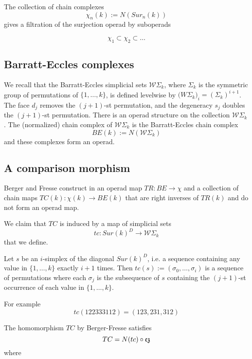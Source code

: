 
The collection of chain complexes 
$$\chi_n(k):=N(Sur_n(k))$$ 
gives a filtration of the surjection operad by suboperads

$$\chi_1 \subset \chi_2 \subset  \dots $$



\subsection{Barratt-Eccles complexes}

We recall that the Barratt-Eccles simplicial sets $\mathcal{W}\Sigma_k$, where  $\Sigma_k$ is the symmetric group of permutations of $\{1,\dots,k\}$, is defined levelwise by
$\mathcal({W}\Sigma_k)_i=(\Sigma_k)^{i+1}$. The face $d_{j}$ removes the $(j+1)$-st permutation, and the degeneracy $s_j$ doubles the $(j+1)$-st permutation. There is an operad structure on the collection $\mathcal{W} \Sigma_k$.
The (normalized) chain complex of $\mathcal{W}\Sigma_k$ is the Barratt-Eccles chain complex $$BE(k):=N(\mathcal{W}\Sigma_k)$$
and these complexes form an operad.

\subsection{A comparison morphism}

Berger and Fresse construct in \cite{BFsmall} 
  an operad map $TR:BE \to \chi$
and a collection of
chain maps $TC(k):\chi(k) \to BE(k)$
that are right inverses of $TR(k)$ and do not form an operad map.

We claim that $TC$ is induced by a map of simplicial sets
$$tc: Sur(k)^D \to \mathcal{W}\Sigma_k$$ that we define. 
\begin{definition}
Let $s$ be an $i$-simplex  of the diagonal $Sur(k)^D$, i.e. a sequence containing any value in $\{1,\dots,k\}$ exactly $i+1$ times. 
Then $tc(s):=(\sigma_0,\dots,\sigma_i)$ is a sequence of permutations where each $\sigma_j$ is the subsequence of $s$ containing the $(j+1)$-st occurrence of each value in $\{1,\dots,k\}$.
 \end{definition}

 For example 
 $$tc(122333112)=(123,231,312)$$

\begin{proposition} 
The homomorphism $TC$ by Berger-Fresse satisfies
$$TC=N(tc) \circ \operatorname{\mathfrak{ez}}$$ where
\end{proposition}

